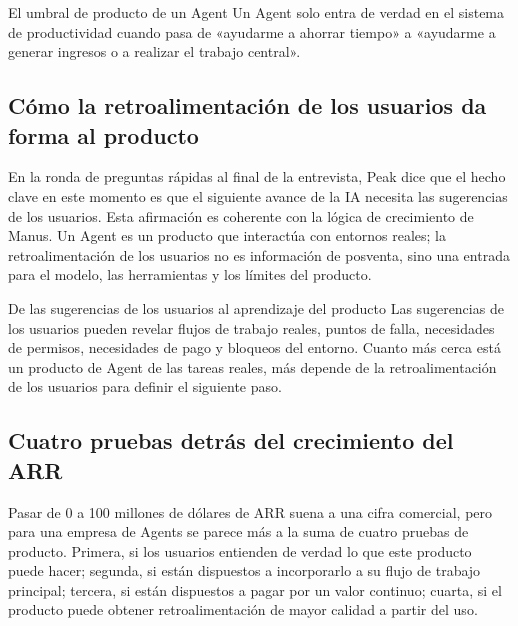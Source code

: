 \documentclass[a4paper]{article}
\begin{document}
\begin{importantbox}{El umbral de producto de un Agent}
Un Agent solo entra de verdad en el sistema de productividad cuando pasa de «ayudarme a ahorrar tiempo» a «ayudarme a generar ingresos o a realizar el trabajo central».
\end{importantbox}

\subsection{Cómo la retroalimentación de los usuarios da forma al producto}

En la ronda de preguntas rápidas al final de la entrevista, Peak dice que el hecho clave en este momento es que el siguiente avance de la IA necesita las sugerencias de los usuarios. Esta afirmación es coherente con la lógica de crecimiento de Manus. Un Agent es un producto que interactúa con entornos reales; la retroalimentación de los usuarios no es información de posventa, sino una entrada para el modelo, las herramientas y los límites del producto.

\begin{knowledgebox}{De las sugerencias de los usuarios al aprendizaje del producto}
Las sugerencias de los usuarios pueden revelar flujos de trabajo reales, puntos de falla, necesidades de permisos, necesidades de pago y bloqueos del entorno. Cuanto más cerca está un producto de Agent de las tareas reales, más depende de la retroalimentación de los usuarios para definir el siguiente paso.
\end{knowledgebox}

\subsection{Cuatro pruebas detrás del crecimiento del ARR}

Pasar de 0 a 100 millones de dólares de ARR suena a una cifra comercial, pero para una empresa de Agents se parece más a la suma de cuatro pruebas de producto. Primera, si los usuarios entienden de verdad lo que este producto puede hacer; segunda, si están dispuestos a incorporarlo a su flujo de trabajo principal; tercera, si están dispuestos a pagar por un valor continuo; cuarta, si el producto puede obtener retroalimentación de mayor calidad a partir del uso.
\end{document}
